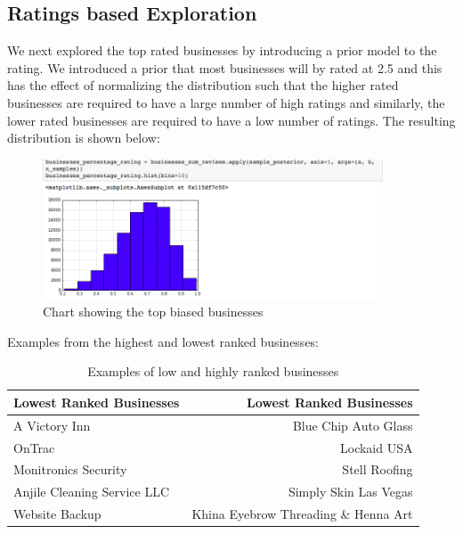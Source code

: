 \documentclass[11pt]{article}
\begin{document}
\subsection*{Ratings based Exploration}

We next explored the top rated businesses by introducing a prior model to the rating. We introduced a prior that most businesses will by rated at 2.5 and this has the effect of normalizing the distribution such that the higher rated businesses are required to have a large number of high ratings and similarly, the lower rated businesses are required to have a low number of ratings. The resulting distribution is shown below:
\begin{figure}[H]
\centering
\includegraphics[width=0.9\textwidth]{./ac209/businessespctrating.png}
\caption{Chart showing the top biased businesses}

\end{figure}

Examples from the highest and lowest ranked businesses:
\begin{table}[H]
\centering
\caption{Examples of low and highly ranked businesses}
\label{my-label}
\begin{tabular}{|l||r|}
	\hline
	\textbf{Lowest Ranked Businesses}  & \textbf{Lowest Ranked Businesses} \\ \hline
	A Victory Inn 		 				& Blue Chip Auto Glass \\ \hline
  OnTrac&                        Lockaid USA \\ \hline
  Monitronics Security&                      Stell Roofing \\ \hline
  Anjile Cleaning Service LLC&              Simply Skin Las Vegas \\ \hline
  Website Backup& Khina Eyebrow Threading \& Henna Art \\ \hline
\end{tabular}
\end{table}
\end{document}
